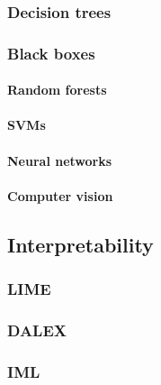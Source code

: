 \documentclass[
]{book}
\begin{document}
\hypertarget{decision-trees}{%
\subsubsection{Decision trees}\label{decision-trees}}

\hypertarget{black-boxes}{%
\subsubsection{Black boxes}\label{black-boxes}}

\hypertarget{random-forests}{%
\paragraph{Random forests}\label{random-forests}}

\hypertarget{svms}{%
\paragraph{SVMs}\label{svms}}

\hypertarget{neural-networks}{%
\paragraph{Neural networks}\label{neural-networks}}

\hypertarget{computer-vision}{%
\paragraph{Computer vision}\label{computer-vision}}

\hypertarget{interpretability}{%
\subsection{Interpretability}\label{interpretability}}

\hypertarget{lime}{%
\subsubsection{LIME}\label{lime}}

\hypertarget{dalex}{%
\subsubsection{DALEX}\label{dalex}}

\hypertarget{iml}{%
\subsubsection{IML}\label{iml}}
\end{document}
